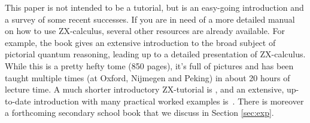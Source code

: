 \documentclass[11pt]{article}
\theoremstyle{definition}
\def\bR{\begin{color}{red}}
\def\e{\end{color}\xspace}
\newcommand{\TODOb}[1]{\marginpar{\scriptsize\bR \textbf{TODO:} #1\e}}
\begin{document}
This paper is not intended to be a tutorial, but is an easy-going introduction and a survey of some recent successes.
If you are in need of a more detailed manual on how to use ZX-calculus, several other resources are already available. For example, the book \cite{CKbook} gives an extensive introduction to the broad subject of pictorial quantum reasoning, leading up to a detailed presentation of ZX-calculus. While  this is a pretty hefty tome (850 pages), it's full of pictures and has been taught multiple times (at Oxford, Nijmegen and Peking) in about 20 hours of lecture time. A much shorter introductory ZX-tutorial is \cite{coecke2012tutorial}, and an extensive, up-to-date introduction with many practical worked examples is~\cite{JohnSurvey}.  There is moreover a forthcoming secondary school book \cite{CoeckeGogioso2018} that we discuss in Section \ref{sec:exp}.

 
\end{document}
